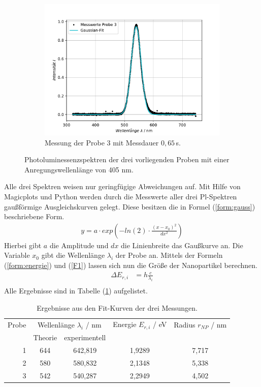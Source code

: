 \begin{figure}[H]
\begin{subfigure}[t]{0.4\textwidth}
	\includegraphics[width=\textwidth]{Plots/aufgabe1a_P3.pdf}
	\caption{Messung der Probe 3 mit Messdauer $0,65 \,$s.}
	\label{abb:A1_P3}
	\end{subfigure}
\caption{Photoluminessenzspektren der drei vorliegenden Proben mit einer Anregungswellenl\"{a}nge von 405 nm.}
\label{abb:auf1a}
\end{figure}
Alle drei Spektren weisen nur geringf\"{u}gige Abweichungen auf.
Mit Hilfe von Magicplots und Python werden durch die Messwerte aller drei Pl-Spektren gau{\ss}f\"{o}rmige Ausgleichskurven gelegt.
Diese besitzen die in Formel (\ref{form:gauss}) beschriebene Form.
\begin{align}
	y = a \cdot exp \left( -ln(2) \cdot \frac{(x-x_0)^2}{dx^2} \right)
\label{form:gauss}
\end{align}
Hierbei gibt $a$ die Amplitude und $dx$ die Linienbreite das Gau{\ss}kurve an.
Die Variable $x_0$ gibt die Wellenl\"{a}nge $\lambda_i$ der Probe an.
Mittels der Formeln (\ref{form:energie}) und (\ref{F1}) lassen sich nun die Gr\"{o}{\ss}e der Nanopartikel berechnen.
\begin{align}
	\Delta E_{r,i} &= h \frac{c}{\lambda_i} \label{form:energie}\\
\end{align}
Alle Ergebnisse sind in Tabelle (\ref{tab:auf1a}) aufgelistet.
\begin{table}
	\centering
	\caption{Ergebnisse aus den Fit-Kurven der drei Messungen.}
\begin{tabular}{|r|cccc|}
	\hline
	{Probe} & \multicolumn{2}{c}{Wellenl\"{a}nge $\lambda_i$ / nm} & {Energie $E_{r,i}$ / eV} & {Radius $r_{NP}$ / nm} \\
	 & Theorie & experimentell &  &  \\
	\hline
	1	&	644	& 642,819 &	1,9289	&	7,717	\\
	2	&	580	& 580,832 &	2,1348	&	5,338	\\
	3	&	542	& 540,287 &	2,2949	&	4,502	\\
	\hline
\end{tabular}
\label{tab:auf1a}
\end{table}

